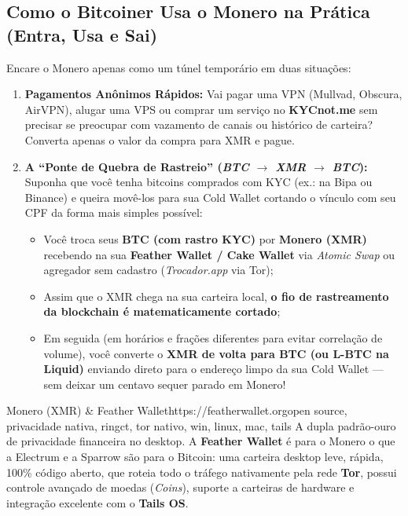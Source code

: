 \documentclass{pousadaguide}
\begin{document}
\subsection{Como o Bitcoiner Usa o Monero na Prática (Entra, Usa e Sai)}

Encare o Monero apenas como um túnel temporário em duas situações:

\begin{enumerate}
  \item \textbf{Pagamentos Anônimos Rápidos:} Vai pagar uma VPN (Mullvad, Obscura, AirVPN), alugar uma VPS ou comprar um serviço no \textbf{KYCnot.me} sem precisar se preocupar com vazamento de canais ou histórico de carteira? Converta apenas o valor da compra para XMR e pague.
  \item \textbf{A “Ponte de Quebra de Rastreio” (\emph{BTC $\to$ XMR $\to$ BTC}):} Suponha que você tenha bitcoins comprados com KYC (ex.: na Bipa ou Binance) e queira movê-los para sua Cold Wallet cortando o vínculo com seu CPF da forma mais simples possível:
  \begin{itemize}
    \item Você troca seus \textbf{BTC (com rastro KYC)} por \textbf{Monero (XMR)} recebendo na sua \textbf{Feather Wallet / Cake Wallet} via \emph{Atomic Swap} ou agregador sem cadastro (\emph{Trocador.app} via Tor);
    \item Assim que o XMR chega na sua carteira local, \textbf{o fio de rastreamento da blockchain é matematicamente cortado};
    \item Em seguida (em horários e frações diferentes para evitar correlação de volume), você converte o \textbf{XMR de volta para BTC (ou L-BTC na Liquid)} enviando direto para o endereço limpo da sua Cold Wallet — sem deixar um centavo sequer parado em Monero!
  \end{itemize}
\end{enumerate}

\begin{ferramenta}[goat,logo=monero,logo2=feather]{Monero (XMR) \& Feather Wallet}{https://featherwallet.org}{open source, privacidade nativa, ringct, tor nativo, win, linux, mac, tails}
A dupla padrão-ouro de privacidade financeira no desktop. A \textbf{Feather Wallet} é para o Monero o que a Electrum e a Sparrow são para o Bitcoin: uma carteira desktop leve, rápida, 100\% código aberto, que roteia todo o tráfego nativamente pela rede \textbf{Tor}, possui controle avançado de moedas (\emph{Coins}), suporte a carteiras de hardware e integração excelente com o \textbf{Tails OS}. 
\end{ferramenta}
\end{document}
